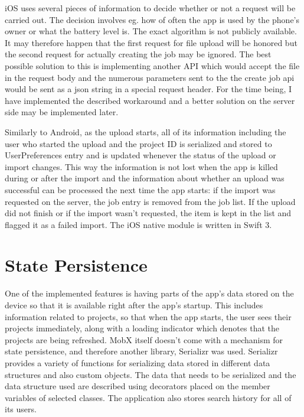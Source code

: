 iOS uses several pieces of information to decide whether or not a request will be carried out. The decision involves eg. how of often the app is used by the phone's owner or what the battery level is. The exact algorithm is not publicly available. It may therefore happen that the first request for file upload will be honored but the second request for actually creating the job may be ignored. The best possible solution to this is implementing another API which would accept the file in the request body and the numerous parameters sent to the the create job api would be sent as a json string in a special request header. For the time being, I have implemented the described workaround and a better solution on the server side may be implemented later. 


Similarly to Android, as the upload starts, all of its information including the user who started the upload and the project ID is serialized and stored to UserPreferences entry and is updated whenever the status of the upload or import changes. This way the information is not lost when the app is killed during or after the import and the information about whether an upload was successful can be processed the next time the app starts: if the import was requested on the server, the job entry is removed from the job list. If the upload did not finish or if the import wasn't requested, the item is kept in the list and flagged it as a failed import. The iOS native module is written in Swift 3.


\section{State Persistence}

One of the implemented features is having parts of the app's data stored on the device so that it is available right after the app’s startup. This includes information related to projects, so that when the app starts, the user sees their projects immediately, along with a loading indicator which denotes that the projects are being refreshed. MobX itself doesn't come with a mechanism for state persistence, and therefore another library, Serializr was used. Serializr provides a variety of functions for serializing data stored in different data structures and also custom objects. The data that needs to be serialized and the data structure used are described using decorators placed on the member variables of selected classes. The application also stores search history for all of its users. 

